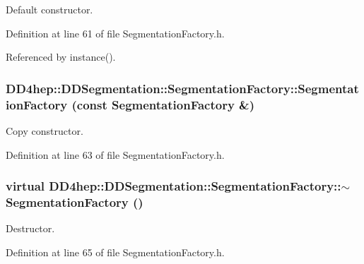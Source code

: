Default constructor. 

Definition at line 61 of file SegmentationFactory.h.

Referenced by instance().\hypertarget{class_d_d4hep_1_1_d_d_segmentation_1_1_segmentation_factory_a6255e4a05ac17c8e9d14d602dbc9d925}{
\subsubsection[{SegmentationFactory}]{\setlength{\rightskip}{0pt plus 5cm}DD4hep::DDSegmentation::SegmentationFactory::SegmentationFactory (const {\bf SegmentationFactory} \&)}}
\label{class_d_d4hep_1_1_d_d_segmentation_1_1_segmentation_factory_a6255e4a05ac17c8e9d14d602dbc9d925}


Copy constructor. 

Definition at line 63 of file SegmentationFactory.h.\hypertarget{class_d_d4hep_1_1_d_d_segmentation_1_1_segmentation_factory_ad6a96f6c5e29ff089d4c0d4196133d07}{
\subsubsection[{$\sim$SegmentationFactory}]{\setlength{\rightskip}{0pt plus 5cm}virtual DD4hep::DDSegmentation::SegmentationFactory::$\sim$SegmentationFactory ()}}
\label{class_d_d4hep_1_1_d_d_segmentation_1_1_segmentation_factory_ad6a96f6c5e29ff089d4c0d4196133d07}


Destructor. 

Definition at line 65 of file SegmentationFactory.h.

